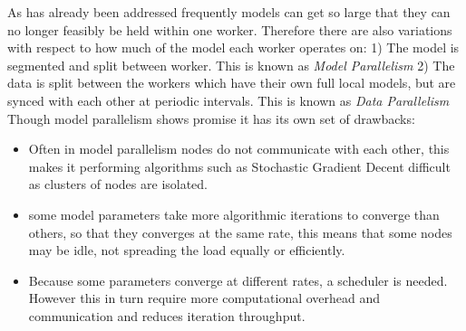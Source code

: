 As has already been addressed frequently models can get so large that they can
no longer feasibly be held within one worker. Therefore there are also
variations with respect to how much of the model each worker operates on: 1) The
model is segmented and split between worker. This is known as \textit{Model Parallelism} 
2) The data is split between the workers which have their own full
local models, but are synced with each other at periodic intervals. This is
known as \textit{Data Parallelism} \cite{Xing2015Petuum} Though model
parallelism shows promise it has its own set of drawbacks:
\begin{itemize}
    \item Often in model parallelism nodes do not communicate with each other,
    this makes it performing algorithms such as Stochastic Gradient Decent
    difficult as clusters of nodes are isolated.
    \item some model parameters take more algorithmic iterations to converge
    than others, so that they converges at the same rate,
    this means that some nodes may be idle, not spreading the load equally or
    efficiently. \cite{Dean2012Distbelief}
    \item Because some parameters converge at different rates, a scheduler is
    needed. However this in turn require more computational overhead and
    communication and reduces iteration throughput. \cite{kim2016STRADS}
\end{itemize}

